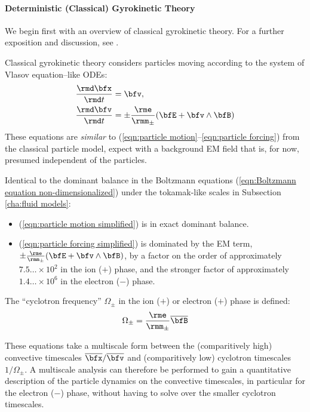 \paragraph*{Deterministic (Classical) Gyrokinetic Theory}
    We begin first with an overview of classical gyrokinetic theory. For a further exposition and discussion, see \cite{Woods_2006, Freidberg_2008, Chen_2015}.

    Classical gyrokinetic theory considers particles moving according to the system of Vlasov equation--like ODEs:
    \begin{align}
        \frac{\rmd\bfx}{\rmd t}  &=  \bfv,  \label{eqn:particle motion simplified}  \\
        \frac{\rmd\bfv}{\rmd t}  &=  \pm\frac{\rme}{\rmm_{\pm}}(\bfE + \bfv\wedge\bfB)  \label{eqn:particle forcing simplified}
    \end{align}
    These equations are \emph{similar} to (\ref{eqn:particle motion}--\ref{eqn:particle forcing}) from the classical particle model, expect with a background EM field that is, for now, presumed independent of the particles.
    
    Identical to the dominant balance in the Boltzmann equations (\ref{eqn:Boltzmann equation non-dimensionalized}) under the tokamak-like scales in Subsection \ref{cha:fluid models}:
    \begin{itemize}
        \item  (\ref{eqn:particle motion simplified}) is in exact dominant balance.
        \item  (\ref{eqn:particle forcing simplified}) is dominated by the EM term, $\pm\frac{\rme}{\rmm_{\pm}}(\bfE + \bfv\wedge\bfB)$, by a factor on the order of approximately $7.5\ldots\times 10^{2}$ in the ion ($+$) phase, and the stronger factor of approximately $1.4\ldots\times 10^{6}$ in the electron ($-$) phase. 
    \end{itemize}

    \begin{definition}
        The ``cyclotron frequency'' $\Omega_{\pm}$ in the ion ($+$) or electron ($+$) phase is defined: 
        \begin{equation}
            \Omega_{\pm}  =  \frac{\rme}{\rmm_{\pm}}\overline{\bfB}
        \end{equation}
    \end{definition}
    
    These equations take a multiscale form between the (comparitively high) convective timescales $\overline{\bfx}/\overline{\bfv}$ and (comparitively low) cyclotron timescales $1/\Omega_{\pm}$. A multiscale analysis \cite{Kevorkin_Cole_2012} can therefore be performed to gain a quantitative description of the particle dynamics on the convective timescales, in particular for the electron ($-$) phase, without having to solve over the smaller cyclotron timescales.

